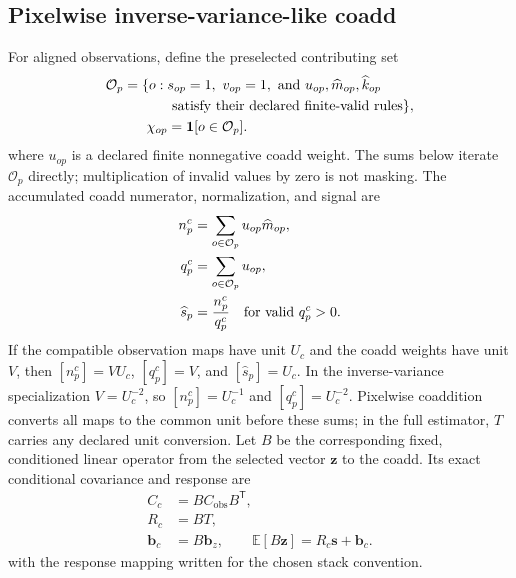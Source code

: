 \documentclass[11pt]{article}
\newcommand{\E}{\mathbb{E}}
\newcommand{\trans}{\mathsf{T}}
\begin{document}
\subsection{Pixelwise inverse-variance-like coadd}

For aligned observations, define the preselected contributing set
\begin{equation}
 \begin{aligned}
 \mathcal O_p=\{o:\;&s_{op}=1,\ v_{op}=1,\hbox{ and }u_{op},
 \widehat m_{op},\widehat k_{op}\\
 &\hbox{ satisfy their declared finite-valid rules}\},\\
 \chi_{op}&=\mathbf1[o\in\mathcal O_p].
 \end{aligned}
 \label{eq:coadd-contribution-set}
\end{equation}
where \(u_{op}\) is a declared finite nonnegative coadd weight. The sums below
iterate \(\mathcal O_p\) directly; multiplication of invalid values by zero is
not masking. The accumulated coadd numerator, normalization, and signal are
\begin{align}
 n^{c}_p &=\sum_{o\in\mathcal O_p}u_{op}\widehat m_{op},
 \label{eq:coadd-numerator}\\
 q^{c}_p &=\sum_{o\in\mathcal O_p}u_{op},
 \label{eq:coadd-denominator}\\
 \widehat s_p &=\frac{n^{c}_p}{q^{c}_p}
 \quad\hbox{for valid }q^{c}_p>0.
 \label{eq:coadd-map}
\end{align}
If the compatible observation maps have unit \(U_c\) and the coadd weights
have unit \(V\), then \([n^c_p]=V U_c\), \([q^c_p]=V\), and
\([\widehat s_p]=U_c\). In the inverse-variance specialization
\(V=U_c^{-2}\), so \([n^c_p]=U_c^{-1}\) and \([q^c_p]=U_c^{-2}\).
Pixelwise coaddition converts all maps to the common unit before these sums;
in the full estimator, \(T\) carries any declared unit conversion.
Let \(B\) be the corresponding fixed, conditioned linear operator from the
selected vector \(\boldsymbol z\) to the coadd. Its exact conditional
covariance and response are
\begin{align}
 C_{c}&=B C_{\mathrm{obs}}B^\trans,
 \label{eq:coadd-full-covariance}\\
 R_c&=B T,
 \label{eq:coadd-response}\\
 \boldsymbol b_c&=B\boldsymbol b_z,
 \qquad \E[B\boldsymbol z]=R_c\boldsymbol s+\boldsymbol b_c.
 \label{eq:coadd-affine-mean}
\end{align}
with the response mapping written for the chosen stack convention.
\end{document}
